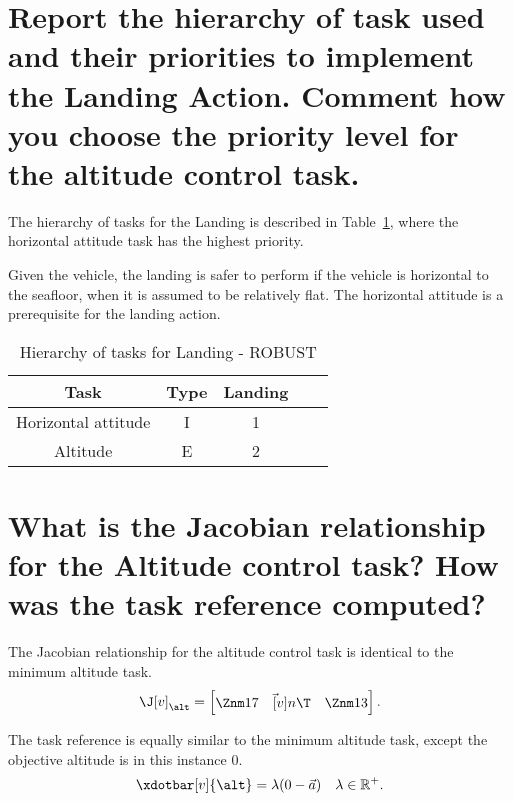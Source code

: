 	\begin{parts}
		\part{Report the hierarchy of task used and their priorities to
			implement the Landing Action. Comment how you choose the priority level for the
		altitude control task.}

		\begin{solutionorbox}
			The hierarchy of tasks for the Landing is described in
			Table~\ref{table:tkip_landing_robust}, where the horizontal
			attitude task has the highest priority.

			Given the vehicle, the landing is safer to perform if
			the vehicle is horizontal to the seafloor, when it is
			assumed to be relatively flat. The horizontal attitude
			is a prerequisite for the landing action.
		\end{solutionorbox}
		\begin{table}[htb]
			\caption{Hierarchy of tasks for Landing - ROBUST}
			\label{table:tkip_landing_robust}
			\begin{center}
				\footnotesize
				\begin{tabular}{ccccc}
					\toprule
					Task & Type & Landing
					\\
					\midrule
					Horizontal attitude & I & 1 \\
					\hdashline
					Altitude & E & 2 \\
					\bottomrule
				\end{tabular}
			\end{center}
		\end{table}%

		\part{What is the Jacobian relationship for the Altitude control
		task? How was the task reference computed?}

		\begin{solutionorbox}
			The Jacobian relationship for the altitude control task is
			identical to the minimum altitude task.
			\[
				\J[v]_{\alt} = \begin{bmatrix}
					\Znm17\quad
					\vec[v]n\T\quad
					\Znm13
				\end{bmatrix}\mathrm{.}
			\]

			The task reference is equally similar to the minimum
			altitude task, except the objective altitude is in this
			instance $0$.
			\[
				\xdotbar[v]{\alt} = \lambda(0 - \vec{a})
				\quad \lambda\in\mathbb{R}^+
				\mathrm{.}
			\]


\end{solutionorbox}
\end{parts}
